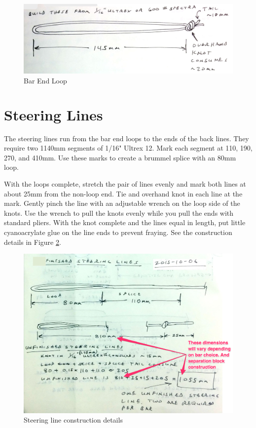 \documentclass[]{book}
\begin{document}
\begin{figure}

{\centering \includegraphics[width=0.7\linewidth]{images/05_kite_bar_rigging_2015-10-06_3} 

}

\caption{Bar End Loop}\label{fig:bar-end-loop}
\end{figure}

\hypertarget{steering-lines}{%
\section{Steering Lines}\label{steering-lines}}

The steering lines run from the bar end loops to the ends of the back lines. They require two 1140mm segments of 1/16" Ultrex 12. Mark each segment at 110, 190, 270, and 410mm. Use these marks to create a brummel splice with an 80mm loop.

With the loops complete, stretch the pair of lines evenly and mark both lines at about 25mm from the non-loop end. Tie and overhand knot in each line at the mark. Gently pinch the line with an adjustable wrench on the loop side of the knots. Use the wrench to pull the knots evenly while you pull the ends with standard pliers. With the knot complete and the lines equal in length, put little cyanoacrylate glue on the line ends to prevent fraying. See the construction details in Figure \ref{fig:steering-lines}.

\begin{figure}

{\centering \includegraphics[width=0.7\linewidth]{images/04_kite_bar_rigging_2015-10-06_2} 

}

\caption{Steering line construction details}\label{fig:steering-lines}
\end{figure}
\end{document}
